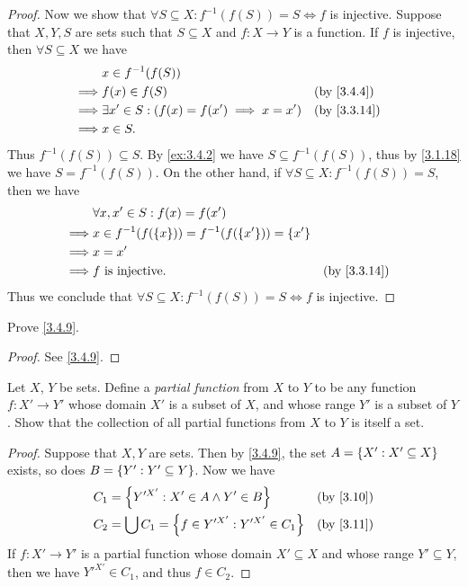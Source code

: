 \begin{proof}
	Now we show that \(\forall S \subseteq X : f^{-1}(f(S)) = S \iff f\) is injective.
	Suppose that \(X, Y, S\) are sets such that \(S \subseteq X\) and \(f : X \to Y\) is a function.
	If \(f\) is injective, then \(\forall S \subseteq X\) we have
	\begin{align*}
		         & x \in f^{-1}(f(S))                                                 \\
		\implies & f(x) \in f(S)                                     &  & \by{3.4.4}  \\
		\implies & \exists x' \in S : (f(x) = f(x') \implies x = x') &  & \by{3.3.14} \\
		\implies & x \in S.
	\end{align*}
	Thus \(f^{-1}(f(S)) \subseteq S\).
	By \cref{ex:3.4.2} we have \(S \subseteq f^{-1}(f(S))\), thus by \cref{3.1.18} we have \(S = f^{-1}(f(S))\).
	On the other hand, if \(\forall S \subseteq X : f^{-1}(f(S)) = S\), then we have
	\begin{align*}
		         & \forall x, x' \in S : f(x) = f(x')                                         \\
		\implies & x \in f^{-1}(f(\set{x})) = f^{-1}(f(\set{x'})) = \set{x'}                  \\
		\implies & x = x'                                                                     \\
		\implies & f \text{ is injective}.                                   &  & \by{3.3.14}
	\end{align*}
	Thus we conclude that \(\forall S \subseteq X : f^{-1}(f(S)) = S \iff f\) is injective.
\end{proof}

\begin{ex}\label{ex:3.4.6}
	Prove \cref{3.4.9}.
\end{ex}

\begin{proof}
	See \cref{3.4.9}.
\end{proof}

\begin{ex}\label{ex:3.4.7}
	Let \(X\), \(Y\) be sets.
	Define a \emph{partial function} from \(X\) to \(Y\) to be any function \(f : X' \to Y'\) whose domain \(X'\) is a subset of \(X\), and whose range \(Y'\) is a subset of \(Y\).
	Show that the collection of all partial functions from \(X\) to \(Y\) is itself a set.
\end{ex}

\begin{proof}
	Suppose that \(X, Y\) are sets.
	Then by \cref{3.4.9}, the set \(A = \left\lbrace X' : X' \subseteq X\right\rbrace\) exists, so does \(B = \left\lbrace Y' : Y' \subseteq Y\right\rbrace\).
	Now we have
	\begin{align*}
		C_1 & = \set{Y'^{X'} : X' \in A \land Y' \in B}             &  & \by{3.10} \\
		C_2 & = \bigcup C_1 = \set{f \in Y'^{X'} : Y'^{X'} \in C_1} &  & \by{3.11} \\
	\end{align*}
	If \(f : X' \to Y'\) is a partial function whose domain \(X' \subseteq X\) and whose range \(Y' \subseteq Y\), then we have \(Y'^{X'} \in C_1\), and thus \(f \in C_2\).
\end{proof}

